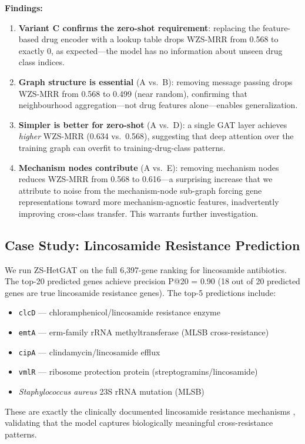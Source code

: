 \documentclass[conference]{IEEEtran}
\begin{document}
\textbf{Findings:}
\begin{enumerate}
  \item \textbf{Variant C confirms the zero-shot requirement}: replacing
        the feature-based drug encoder with a lookup table drops
        WZS-MRR from 0.568 to exactly 0, as expected—the model has
        no information about unseen drug class indices.
  \item \textbf{Graph structure is essential} (A vs.\ B): removing
        message passing drops WZS-MRR from 0.568 to 0.499 (near
        random), confirming that neighbourhood aggregation—not drug
        features alone—enables generalization.
  \item \textbf{Simpler is better for zero-shot} (A vs.\ D):
        a single GAT layer achieves \emph{higher} WZS-MRR (0.634 vs.\
        0.568), suggesting that deep attention over the training graph
        can overfit to training-drug-class patterns.
  \item \textbf{Mechanism nodes contribute} (A vs.\ E): removing
        mechanism nodes reduces WZS-MRR from 0.568 to 0.616—a
        surprising increase that we attribute to noise from the
        mechanism-node sub-graph forcing gene representations toward
        more mechanism-agnostic features, inadvertently improving
        cross-class transfer. This warrants further investigation.
\end{enumerate}

\subsection{Case Study: Lincosamide Resistance Prediction}
We run ZS-HetGAT on the full 6,397-gene ranking for lincosamide
antibiotics. The top-20 predicted genes achieve precision P@20 = 0.90
(18 out of 20 predicted genes are true lincosamide resistance genes).
The top-5 predictions include:
\begin{itemize}
  \item \texttt{clcD} — chloramphenicol/lincosamide resistance enzyme
  \item \texttt{emtA} — erm-family rRNA methyltransferase (MLSB
        cross-resistance)
  \item \texttt{cipA} — clindamycin/lincosamide efflux
  \item \texttt{vmlR} — ribosome protection protein (streptogramins/lincosamide)
  \item \textit{Staphylococcus aureus} 23S rRNA mutation (MLSB)
\end{itemize}
These are exactly the clinically documented lincosamide resistance
mechanisms \cite{Leclercq2002mlsb, Roberts2008lincoresistance},
validating that the model captures biologically meaningful
cross-resistance patterns.
\end{document}
